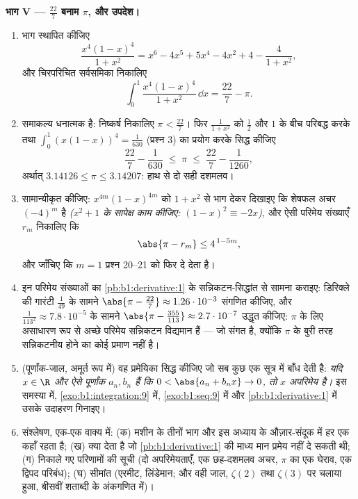 \begin{problem}
\medskip \noindent\textbf{भाग V --- $\frac{22}{7}$ बनाम $\pi$, और उपदेश।}
\begin{enumerate}[resume]
  \item {} भाग स्थापित कीजिए
        \[
        \frac{x^4(1-x)^4}{1 + x^2}
        = x^6 - 4x^5 + 5x^4 - 4x^2 + 4 - \frac{4}{1 + x^2},
        \]
        और चिरपरिचित सर्वसमिका निकालिए
        \[
        \int_0^1 \frac{x^4 (1-x)^4}{1 + x^2}\,\dd x
        = \frac{22}{7} - \pi .
        \]
  \item समाकल्य धनात्मक है: निष्कर्ष निकालिए $\pi < \frac{22}{7}$। फिर
  $\frac{1}{1+x^2}$ को $\frac12$ और $1$ के बीच परिबद्ध करके तथा $\int_0^1
  (x(1-x))^4 = \frac{1}{630}$ (प्रश्न 3) का प्रयोग करके सिद्ध कीजिए
        \[
        \frac{22}{7} - \frac{1}{630} \;\leq\; \pi \;\leq\;
        \frac{22}{7} - \frac{1}{1260} ,
        \]
        अर्थात् $3.14126 \leq \pi \leq 3.14207$: हाथ से दो सही दशमलव।
  \item सामान्यीकृत कीजिए: $x^{4m}(1-x)^{4m}$ को $1 + x^2$ से भाग देकर
  दिखाइए कि शेषफल अचर $(-4)^m$ है \emph{($x^2 + 1$ के सापेक्ष काम कीजिए:
  $(1-x)^2 \equiv -2x$)}, और ऐसी परिमेय संख्याएँ $r_m$ निकालिए कि
        \[
        \abs{\pi - r_m} \leq 4^{\,1 - 5m} ,
        \]
        और जाँचिए कि $m = 1$ प्रश्न 20--21 को फिर दे देता है।
  \item इन परिमेय संख्याओं का \cref{pb:b1:derivative:1} के सन्निकटन-सिद्धांत
  से सामना कराइए: डिरिक्ले की गारंटी $\frac{1}{49}$ के सामने $\abs{\pi -
  \frac{22}{7}} \approx 1.26\cdot10^{-3}$ संगणित कीजिए, और $\frac{1}{113^2}
  \approx 7.8\cdot10^{-5}$ के सामने $\abs{\pi - \frac{355}{113}} \approx
  2.7\cdot10^{-7}$ उद्धृत कीजिए: $\pi$ के लिए असाधारण रूप से अच्छे परिमेय
  सन्निकटन विद्यमान हैं --- जो संगत है, क्योंकि $\pi$ के बुरी तरह सन्निकटनीय
  होने का कोई प्रमाण नहीं है।
  \item (पूर्णांक-जाल, अमूर्त रूप में) वह प्रमेयिका सिद्ध कीजिए जो सब कुछ एक
  सूत्र में बाँध देती है: \emph{यदि $x \in \R$ और ऐसे पूर्णांक $a_n, b_n$
  हैं कि $0 < \abs{a_n + b_n x} \to 0$, तो $x$ अपरिमेय है।} इस समस्या में,
  \cref{exo:b1:integration:9} में, \cref{exo:b1:seq:9} में और
  \cref{pb:b1:derivative:1} में उसके उदाहरण गिनाइए।
  \item संश्लेषण, एक-एक वाक्य में: (क) मशीन के तीनों भाग और इस अध्याय के
  औज़ार-संदूक में हर एक कहाँ रहता है; (ख)  क्या देता है जो
  \cref{pb:b1:derivative:1} की माध्य मान प्रमेय नहीं दे सकती थी; (ग) निकाले
  गए परिणामों की सूची (दो अपरिमेयताएँ, एक छह-दशमलव अचर, $\pi$ का एक घेराव,
  एक द्विपद परिबंध); (घ) सीमांत (एरमीट, लिंडेमान; और वही जाल, $\zeta(2)$ तथा
  $\zeta(3)$ पर चलाया हुआ, बीसवीं शताब्दी के अंकगणित में)।
\end{enumerate}
\end{problem}
